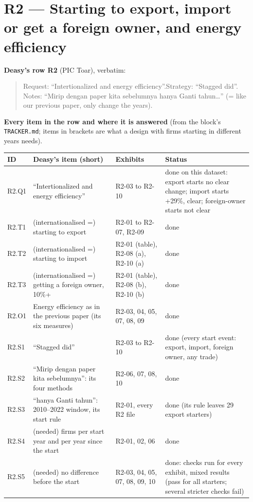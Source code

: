 \clearpage
\section{R2 --- Starting to export, import or get a foreign owner, and energy efficiency}

{\small\textbf{Deasy's row R2} (PIC Toar), verbatim:}
\begin{quote}\small
Request: ``Intertionalized and energy efficiency''.\quad Strategy: ``Stagged did''.\quad
Notes: ``Mirip dengan paper kita sebelumnya hanya Ganti tahun\ldots'' (= like our previous paper, only change the years).
\end{quote}

{\small\textbf{Every item in the row and where it is answered} (from the block's \texttt{TRACKER.md}; items in brackets are what a
design with firms starting in different years needs).}\par\smallskip
{\footnotesize
\begin{tabularx}{\linewidth}{@{}l>{\raggedright\arraybackslash}X>{\raggedright\arraybackslash}p{4.4cm}>{\raggedright\arraybackslash}p{5.2cm}@{}}
\toprule
ID & Deasy's item (short) & Exhibits & Status \\
\midrule
R2.Q1 & ``Intertionalized and energy efficiency'' & R2-03 to R2-10 & done on this dataset: export starts no clear change; import starts +29\%, clear; foreign-owner starts not clear \\
R2.T1 & (internationalised =) starting to export & R2-01 to R2-07, R2-09 & done \\
R2.T2 & (internationalised =) starting to import & R2-01 (table), R2-08 (a), R2-10 (a) & done \\
R2.T3 & (internationalised =) getting a foreign owner, 10\%+ & R2-01 (table), R2-08 (b), R2-10 (b) & done \\
R2.O1 & Energy efficiency as in the previous paper (its six measures) & R2-03, 04, 05, 07, 08, 09 & done \\
R2.S1 & ``Stagged did'' & R2-03 to R2-10 & done (every start event: export, import, foreign owner, any trade) \\
R2.S2 & ``Mirip dengan paper kita sebelumnya'': its four methods & R2-06, 07, 08, 10 & done \\
R2.S3 & ``hanya Ganti tahun'': 2010--2022 window, its start rule & R2-01, every R2 file & done (its rule leaves 29 export starters) \\
R2.S4 & (needed) firms per start year and per year since the start & R2-01, 02, 06 & done \\
R2.S5 & (needed) no difference before the start & R2-03, 04, 05, 07, 08, 09, 10 & done: checks run for every exhibit, mixed results (pass for all starters; several stricter checks fail) \\
\bottomrule
\end{tabularx}}

